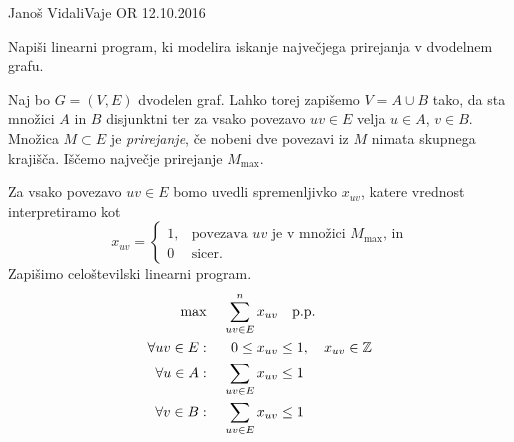\begin{naloga}{Janoš Vidali}{Vaje OR 12.10.2016}
\begin{vprasanje}
Napiši linearni program,
ki modelira iskanje največjega prirejanja v dvodelnem grafu.
\end{vprasanje}

\begin{odgovor}
Naj bo $G = (V, E)$ dvodelen graf.
Lahko torej zapišemo $V = A \cup B$ tako,
da sta množici $A$ in $B$ disjunktni
ter za vsako povezavo $uv \in E$ velja $u \in A$, $v \in B$.
Množica $M \subset E$ je {\em prirejanje},
če nobeni dve povezavi iz $M$ nimata skupnega krajišča.
Iščemo največje prirejanje $M_{\max}$.

Za vsako povezavo $uv \in E$ bomo uvedli spremenljivko $x_{uv}$,
katere vrednost interpretiramo kot
$$
x_{uv} = \begin{cases}
1, & \text{povezava $uv$ je v množici $M_{\max}$, in} \\
0  & \text{sicer.}
\end{cases}
$$
Zapišimo celoštevilski linearni program.
\begin{alignat*}{2}
\max &\ & \sum_{uv \in E}^n x_{uv} &\quad \text{p.p.} \\
\forall uv \in E: &\ & 0 \le x_{uv} &\le 1, \quad x_{uv} \in \mathbb{Z} \\
\forall u \in A: &\ & \sum_{uv \in E} x_{uv} &\le 1 \\
\forall v \in B: &\ & \sum_{uv \in E} x_{uv} &\le 1
\end{alignat*}
\end{odgovor}
\end{naloga}


